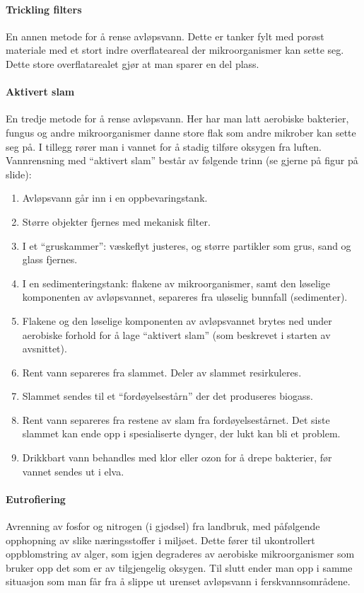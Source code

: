 \paragraph{Trickling filters} En annen metode for å rense avløpsvann. Dette er tanker fylt med porøst materiale med et stort indre overflateareal der mikroorganismer kan sette seg. Dette store overflatarealet gjør at man sparer en del plass. 

\paragraph{Aktivert slam} En tredje metode for å rense avløpsvann. Her har man latt aerobiske bakterier, fungus og andre mikroorganismer danne store flak som andre mikrober kan sette seg på. I tillegg rører man i vannet for å stadig tilføre oksygen fra luften. Vannrensning med ``aktivert slam'' består av følgende trinn (se gjerne på figur på slide):
\begin{enumerate}
	\item Avløpsvann går inn i en oppbevaringstank.
	\item Større objekter fjernes med mekanisk filter.
	\item I et ``gruskammer'': væskeflyt justeres, og større partikler som grus, sand og glass fjernes.
	\item I en sedimenteringstank: flakene av mikroorganismer, samt den løselige komponenten av avløpsvannet, separeres fra uløselig bunnfall (sedimenter).
	\item Flakene og den løselige komponenten av avløpsvannet brytes ned under aerobiske forhold for å lage ``aktivert slam'' (som beskrevet i starten av avsnittet).
	\item Rent vann separeres fra slammet. Deler av slammet resirkuleres.
	\item Slammet sendes til et ``fordøyelsestårn'' der det produseres biogass.
	\item Rent vann separeres fra restene av slam fra fordøyelsestårnet. Det siste slammet kan ende opp i spesialiserte dynger, der lukt kan bli et problem.
	\item Drikkbart vann behandles med klor eller ozon for å drepe bakterier, før vannet sendes ut i elva.
\end{enumerate}

\paragraph{Eutrofiering} Avrenning av fosfor og nitrogen (i gjødsel) fra landbruk, med påfølgende opphopning av slike næringsstoffer i miljøet. Dette fører til ukontrollert oppblomstring av alger, som igjen degraderes av aerobiske mikroorganismer som bruker opp det som er av tilgjengelig oksygen. Til slutt ender man opp i samme situasjon som man får fra å slippe ut urenset avløpsvann i ferskvannsområdene.

